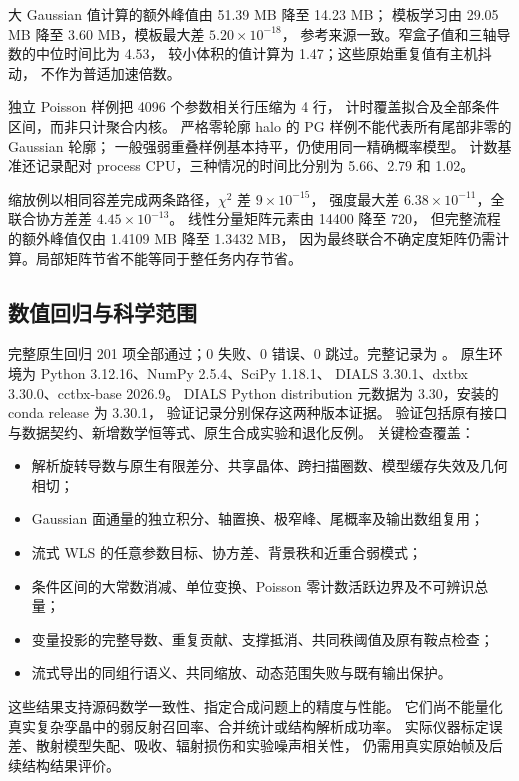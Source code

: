 \documentclass[UTF8,11pt,a4paper,fontset=fandol]{ctexart}
\newcommand{\RoundTwoTests}{完整原生回归 201 项全部通过；0 失败、0 错误、0 跳过}
\begin{document}
大 Gaussian 值计算的额外峰值由 51.39 MB 降至 14.23 MB；
模板学习由 29.05 MB 降至 3.60 MB，模板最大差 $5.20\times10^{-18}$，
参考来源一致。窄盒子值和三轴导数的中位时间比为 4.53，
较小体积的值计算为 1.47；这些原始重复值有主机抖动，
不作为普适加速倍数。

独立 Poisson 样例把 4096 个参数相关行压缩为 4 行，
计时覆盖拟合及全部条件区间，而非只计聚合内核。
严格零轮廓 halo 的 PG 样例不能代表所有尾部非零的 Gaussian 轮廓；
一般强弱重叠样例基本持平，仍使用同一精确概率模型。
计数基准还记录配对 process CPU，三种情况的时间比分别为
5.66、2.79 和 1.02。

缩放例以相同容差完成两条路径，$\chi^2$ 差 $9\times10^{-15}$，
强度最大差 $6.38\times10^{-11}$，全联合协方差差 $4.45\times10^{-13}$。
线性分量矩阵元素由 14400 降至 720，
但完整流程的额外峰值仅由 1.4109 MB 降至 1.3432 MB，
因为最终联合不确定度矩阵仍需计算。局部矩阵节省不能等同于整任务内存节省。

\subsection{数值回归与科学范围}

\RoundTwoTests。完整记录为
。
原生环境为 Python 3.12.16、NumPy 2.5.4、SciPy 1.18.1、
DIALS 3.30.1、dxtbx 3.30.0、cctbx-base 2026.9。
DIALS Python distribution 元数据为 3.30，安装的 conda release 为 3.30.1，
验证记录分别保存这两种版本证据。
验证包括原有接口与数据契约、新增数学恒等式、原生合成实验和退化反例。
关键检查覆盖：
\begin{itemize}
\item 解析旋转导数与原生有限差分、共享晶体、跨扫描圈数、模型缓存失效及几何相切；
\item Gaussian 面通量的独立积分、轴置换、极窄峰、尾概率及输出数组复用；
\item 流式 WLS 的任意参数目标、协方差、背景秩和近重合弱模式；
\item 条件区间的大常数消减、单位变换、Poisson 零计数活跃边界及不可辨识总量；
\item 变量投影的完整导数、重复贡献、支撑抵消、共同秩阈值及原有鞍点检查；
\item 流式导出的同组行语义、共同缩放、动态范围失败与既有输出保护。
\end{itemize}

这些结果支持源码数学一致性、指定合成问题上的精度与性能。
它们尚不能量化真实复杂孪晶中的弱反射召回率、合并统计或结构解析成功率。
实际仪器标定误差、散射模型失配、吸收、辐射损伤和实验噪声相关性，
仍需用真实原始帧及后续结构结果评价。
\end{document}
